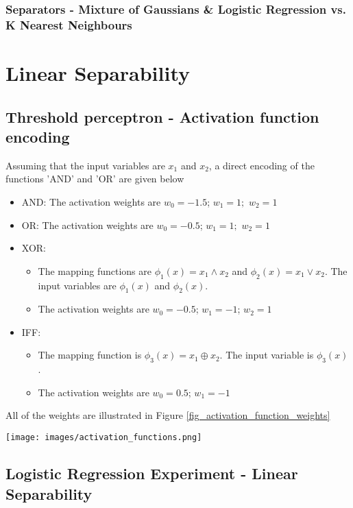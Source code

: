 \documentclass[a4paper]{article}
\begin{document}
\subsubsection*{Separators - Mixture of Gaussians \& Logistic Regression vs. K Nearest Neighbours}

\newpage

\section{Linear Separability}

\subsection{Threshold perceptron - Activation function encoding}
Assuming that the input variables are $x_1$ and $x_2$, a direct encoding of the functions 'AND' and 'OR' are given below
\begin{itemize}
	\item AND: The activation weights are $w_0 = -1.5$; $w_1 = 1;$ $w_2 = 1$
	\item OR: The activation weights are $w_0 = -0.5$; $w_1 = 1;$ $w_2 = 1$
	\item XOR: 
		\begin{itemize}
			\item The mapping functions are $\phi_1(x) = x_1 \land x_2$ and $\phi_2(x) = x_1 \lor x_2$. The input variables are $\phi_1(x)$ and $\phi_2(x)$.
			\item The activation weights are $w_0 = -0.5$; $w_1 = -1$; $w_2 = 1$
		\end{itemize}
	\item IFF: 
		\begin{itemize}
			\item The mapping function is $\phi_3(x) = x_1 \oplus x_2$. The input variable is $\phi_3(x)$.
			\item The activation weights are $w_0 = 0.5$; $w_1 = -1$
		\end{itemize}
\end{itemize}
All of the weights are illustrated in Figure \ref{fig_activation_function_weights}

\begin{figure*}[h]
    \centering
    \texttt{[image: images/activation\_functions.png]}
    \caption{Activation Function Weights}
    \label{fig_activation_function_weights}
\end{figure*}

\newpage

\subsection{Logistic Regression Experiment - Linear Separability}
\end{document}
